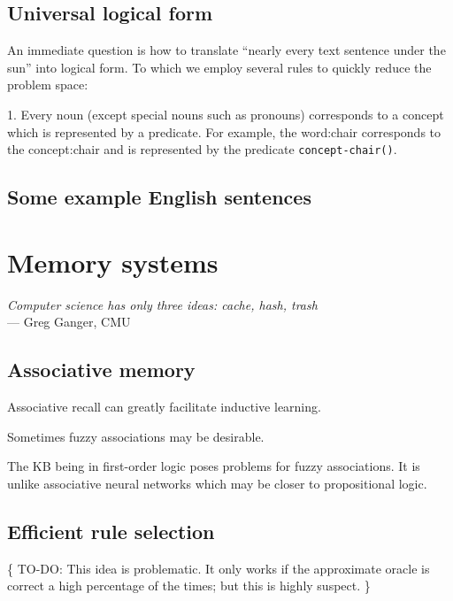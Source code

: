 \documentclass[a4paper]{report}
\begin{document}
\section{Universal logical form}
\label{sec:UniversalLogicalForm}

An immediate question is how to translate ``nearly every text sentence under the sun'' into logical form.  To which we employ several rules to quickly reduce the problem space:

1.  Every noun (except special nouns such as pronouns) corresponds to a concept which is represented by a predicate.  For example, the word:chair corresponds to the concept:chair and is represented by the predicate \texttt{concept-chair()}.



\section{Some example English sentences}
\label{sec:English-examples}

\chapter{Memory systems}
\begin{flushright}
\emph{Computer science has only three ideas: cache, hash, trash}\\ --- Greg Ganger, CMU
\end{flushright}
\minitoc

\section{Associative memory}
\label{sec:associative-memory}

Associative recall can greatly facilitate inductive learning.

Sometimes fuzzy associations may be desirable.

The KB being in first-order logic poses problems for fuzzy associations.  It is unlike associative neural networks which may be closer to propositional logic.

\section{Efficient rule selection}
\label{sec:EfficientRuleSelection}

\{ TO-DO:  This idea is problematic.  It only works if the approximate oracle is correct a high percentage of the times;  but this is highly suspect.  \}
\end{document}
